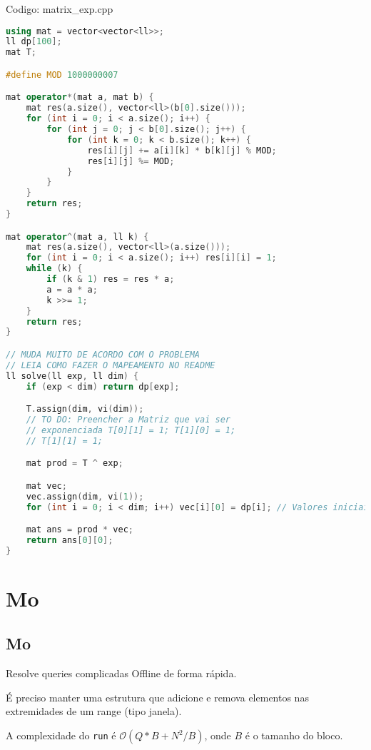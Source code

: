 \documentclass[10pt, a4paper, oneside]{book}
\begin{document}
Codigo: matrix\_exp.cpp

\begin{lstlisting}[language=C++]
using mat = vector<vector<ll>>;
ll dp[100];
mat T;

#define MOD 1000000007

mat operator*(mat a, mat b) {
    mat res(a.size(), vector<ll>(b[0].size()));
    for (int i = 0; i < a.size(); i++) {
        for (int j = 0; j < b[0].size(); j++) {
            for (int k = 0; k < b.size(); k++) {
                res[i][j] += a[i][k] * b[k][j] % MOD;
                res[i][j] %= MOD;
            }
        }
    }
    return res;
}

mat operator^(mat a, ll k) {
    mat res(a.size(), vector<ll>(a.size()));
    for (int i = 0; i < a.size(); i++) res[i][i] = 1;
    while (k) {
        if (k & 1) res = res * a;
        a = a * a;
        k >>= 1;
    }
    return res;
}

// MUDA MUITO DE ACORDO COM O PROBLEMA
// LEIA COMO FAZER O MAPEAMENTO NO README
ll solve(ll exp, ll dim) {
    if (exp < dim) return dp[exp];

    T.assign(dim, vi(dim));
    // TO DO: Preencher a Matriz que vai ser
    // exponenciada T[0][1] = 1; T[1][0] = 1;
    // T[1][1] = 1;

    mat prod = T ^ exp;

    mat vec;
    vec.assign(dim, vi(1));
    for (int i = 0; i < dim; i++) vec[i][0] = dp[i]; // Valores iniciais

    mat ans = prod * vec;
    return ans[0][0];
}
\end{lstlisting}
\hfill

\section{Mo}
\subsection{Mo}


Resolve queries complicadas Offline de forma rápida.  



É preciso manter uma estrutura que adicione e remova elementos nas extremidades de um range (tipo janela).



A complexidade do \texttt{run} é $\mathcal{O}(Q * B + N^2/B)$, onde $B$ é o tamanho do bloco.
\end{document}
